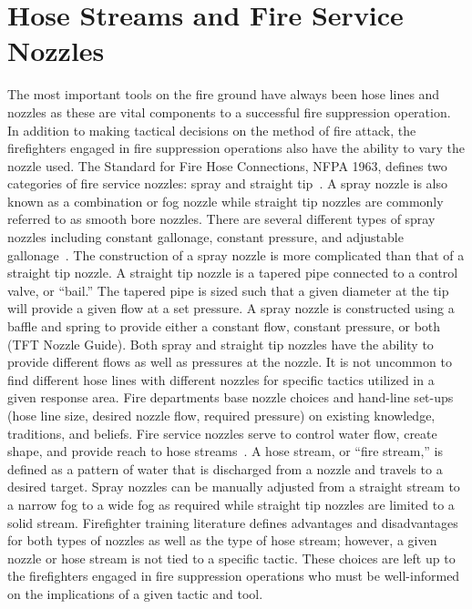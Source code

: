 \documentclass[12pt,oneside]{book}
\begin{document}
\section*{Hose Streams and Fire Service Nozzles}
The most important tools on the fire ground have always been hose lines and nozzles as these are vital components to a successful fire suppression operation. In addition to making tactical decisions on the method of fire attack, the firefighters engaged in fire suppression operations also have the ability to vary the nozzle used. The Standard for Fire Hose Connections, NFPA 1963, defines two categories of fire service nozzles: spray and straight tip~\cite{NFPA1963}. A spray nozzle is also known as a combination or fog nozzle while straight tip nozzles are commonly referred to as smooth bore nozzles. There are several different types of spray nozzles including constant gallonage, constant pressure, and adjustable gallonage~\cite{FEHandbook}. The construction of a spray nozzle is more complicated than that of a straight tip nozzle. A straight tip nozzle is a tapered pipe connected to a control valve, or ``bail.'' The tapered pipe is sized such that a given diameter at the tip will provide a given flow at a set pressure. A spray nozzle is constructed using a baffle and spring to provide either a constant flow, constant pressure, or both (TFT Nozzle Guide). Both spray and straight tip nozzles have the ability to provide different flows as well as pressures at the nozzle. It is not uncommon to find different hose lines with different nozzles for specific tactics utilized in a given response area. Fire departments base nozzle choices and hand-line set-ups (hose line size, desired nozzle flow, required pressure) on existing knowledge, traditions, and beliefs. Fire service nozzles serve to control water flow, create shape, and provide reach to hose streams~\cite{Essentials6}. A hose stream, or ``fire stream,'' is defined as a pattern of water that is discharged from a nozzle and travels to a desired target. Spray nozzles can be manually adjusted from a straight stream to a narrow fog to a wide fog as required while straight tip nozzles are limited to a solid stream. Firefighter training literature defines advantages and disadvantages for both types of nozzles as well as the type of hose stream; however, a given nozzle or hose stream is not tied to a specific tactic. These choices are left up to the firefighters engaged in fire suppression operations who must be well-informed on the implications of a given tactic and tool.
\end{document}
